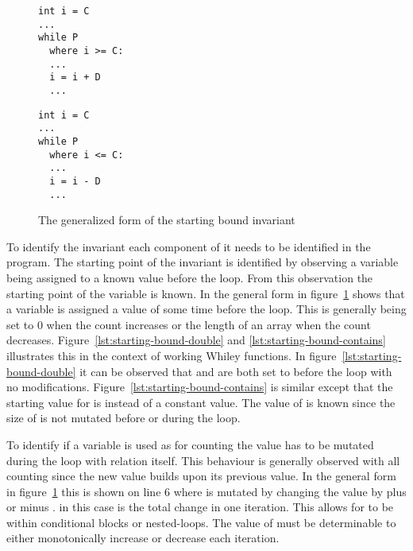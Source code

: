 \begin{figure}[ht]
\noindent\begin{minipage}{.45\textwidth}
\begin{lstlisting}
int i = C
...
while P
  where i >= C:
  ... 
  i = i + D
  ...
\end{lstlisting}

\end{minipage}\hfill
\begin{minipage}{.45\textwidth}
\begin{lstlisting}
int i = C
...
while P
  where i <= C:
  ... 
  i = i - D
  ...
\end{lstlisting}	
\end{minipage}\hfill
\caption{The generalized form of the starting bound invariant}
\label{lst:starting-bound-gen}
\end{figure}

To identify the invariant each component of it needs to be identified in the program.
The starting point of the invariant is identified by observing a variable being
assigned to a known value before the loop.
From this observation the starting point of the variable is known.
In the general form in figure~\ref{lst:starting-bound-gen} shows that a variable  
is assigned a value of  some time before the loop.
This is generally being set to 0 when the count increases or the length of
an array when the count decreases.
Figure~\ref{lst:starting-bound-double} and \ref{lst:starting-bound-contains} illustrates this
in the context of working Whiley functions.
In figure~\ref{lst:starting-bound-double} it can be observed
that  and  are both set to  before the loop with no modifications.
Figure~\ref{lst:starting-bound-contains} is similar except that 
the starting value for  is 
instead of a constant value. The value of  is known since the 
size of  is not mutated before or during the loop.

To identify if a variable is used as for counting the value has to be
mutated during the loop with relation itself.
This behaviour is generally observed with all counting since the 
new value builds upon its previous value.
In the general form in figure~\ref{lst:starting-bound-gen} this is
shown on line 6 where  is mutated by changing the value by plus or minus
.
 in this case is the total change in one iteration.
This allows for  to be within conditional blocks or nested-loops.
The value of  must be determinable to either monotonically increase or decrease  each iteration.



